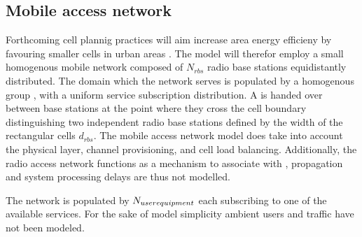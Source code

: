 \subsection{Mobile access network}
Forthcoming cell plannig practices will aim increase area energy efficieny by favouring smaller cells in urban areas \cite{shahab2013framework,5360741}. The model will therefor employ a small homogenous mobile network composed of $N_{rbs}$ radio base stations equidistantly distributed. The domain which the network serves is populated by a homogenous group \ues, with a uniform service subscription distribution. A \ue{} is handed over between base stations at the point where they cross the cell boundary distinguishing two independent radio base stations defined by the width of the rectangular cells $d_{rbs}$. The mobile access network model does take into account the physical layer, channel provisioning, and cell load balancing. Additionally, the radio access network functions as a mechanism to associate \ues{} with \dcs{}, propagation and system processing delays are thus not modelled.

The network is populated by $N_{user equipment}$ each subscribing to one of the available services. For the sake of model simplicity ambient users and traffic have not been modeled.